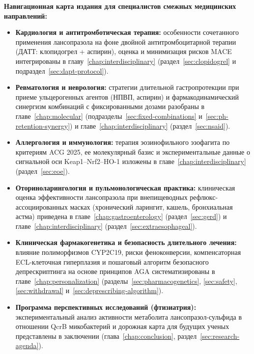 \documentclass[11pt,a4paper,notitlepage]{report}
\newcommand{\src}[1]{\unskip\space\cite{#1}}
\begin{document}
\textbf{Навигационная карта издания для специалистов смежных медицинских направлений:}
\begin{itemize}[itemsep=0.45\baselineskip]
\item \textbf{Кардиология и антитромботическая терапия:} особенности сочетанного применения лансопразола на фоне двойной антитромбоцитарной терапии (ДАТТ: клопидогрел + аспирин), оценка и минимизация рисков MACE интегрированы в главу~\ref{chap:interdisciplinary} (раздел~\ref{sec:clopidogrel} и подраздел~\ref{sec:dapt-protocol}).\src{cardioacc2025,cardioplavix2025,cardiocpic2022}

\item \textbf{Ревматология и неврология:} стратегии длительной гастропротекции при приеме ульцерогенных агентов (НПВП, аспирин) и фармакодинамический синергизм комбинаций с фиксированными дозами разобраны в главе~\ref{chap:molecular} (подразделы~\ref{sec:fixed-combinations} и~\ref{sec:ph-retention-synergy}) и главе~\ref{chap:interdisciplinary} (раздел~\ref{sec:nsaid}).\src{aspirintrial,aspirin15,nsaid15}

\item \textbf{Аллергология и иммунология:} терапия эозинофильного эзофагита по критериям ACG 2025, ее молекулярный базис и экспериментальные данные о сигнальной оси Keap1--Nrf2--HO-1 изложены в главе~\ref{chap:interdisciplinary} (раздел~\ref{sec:eoe}).\src{eoe,eoehighlights2025,molnrf2}

\item \textbf{Оториноларингология и пульмонологическая практика:} клиническая оценка эффективности лансопразола при внепищеводных рефлюкс-ассоциированных масках (хронический ларингит, кашель, бронхиальная астма) приведена в главе~\ref{chap:gastroenterology} (раздел~\ref{sec:gerd}) и главе~\ref{chap:interdisciplinary} (раздел~\ref{sec:extraesophageal}).\src{acggerd,toppits,asthma}

\item \textbf{Клиническая фармакогенетика и безопасность длительного лечения:} влияние полиморфизмов CYP2C19, риски феноконверсии, компенсаторная ECL-клеточная гиперплазия и пошаговый алгоритм безопасного депрескриптинга на основе принципов AGA систематизированы в главе~\ref{chap:personalization} (разделы~\ref{sec:pharmacogenetics}, \ref{sec:safety}, \ref{sec:withdrawal} и~\ref{sec:deprescribing-algorithm}).\src{cpic,withdrawsheng2020,agadepres,withdrawfarrell2017}

\item \textbf{Программа перспективных исследований (фтизиатрия):} экспериментальный анализ активности метаболита лансопразол-сульфида в отношении QcrB микобактерий и дорожная карта для будущих ученых представлены в заключении (глава~\ref{chap:conclusion}, раздел~\ref{sec:research-agenda}).\src{moltb,moltbstructure}
\end{itemize}
\end{document}
